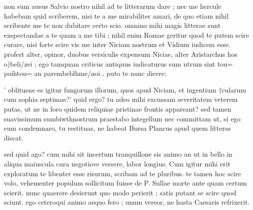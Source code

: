 


 non sum ausus Salvio nostro nihil ad te litterarum dare ; nec me hercule habebam quid scriberem, nisi te a me mirabiliter amari, de quo etiam nihil scribente me te non dubitare certo scio. omnino mihi magis litterae sunt exspectandae a te quam a me tibi ; nihil enim Romae geritur quod te putem scire curare, nisi forte scire vis me inter Niciam nostrum et Vidium iudicem esse. profert alter, opinor, duobus versiculis expensum Niciae, alter Aristarchus hos o)beli/zei ; ego tamquam criticus antiquus iudicaturus sum utrum sint tou= poihtou= an parembeblhme/noi . puto te nunc dicere:

 ' oblitusne es igitur fungorum illorum, quos apud Niciam, et ingentium †cularum cum sophia septimae?' quid ergo? tu adeo mihi excussam severitatem veterem putas, ut ne in foro quidem reliquiae pristinae frontis appareant? sed tamen suavissimum sumbiwth\n nostrum praestabo integellum nec committam ut, si ego eum condemnaro, tu restituas, ne habeat Bursa Plancus apud quem litteras discat.

 sed quid ago? cum mihi sit incertum tranquillone sis animo an ut in bello in aliqua maiuscula cura negotiove versere, labor longius. Cum igitur mihi erit exploratum te libenter esse risurum, scribam ad te pluribus. te tamen hoc scire volo, vehementer populum sollicitum fuisse de P. Sullae morte ante quam certum scierit. nunc quaerere desierunt quo modo perierit ; satis putant se scire quod sciunt. ego ceteroqui animo aequo fero ; unum vereor, ne hasta Caesaris refrixerit.
